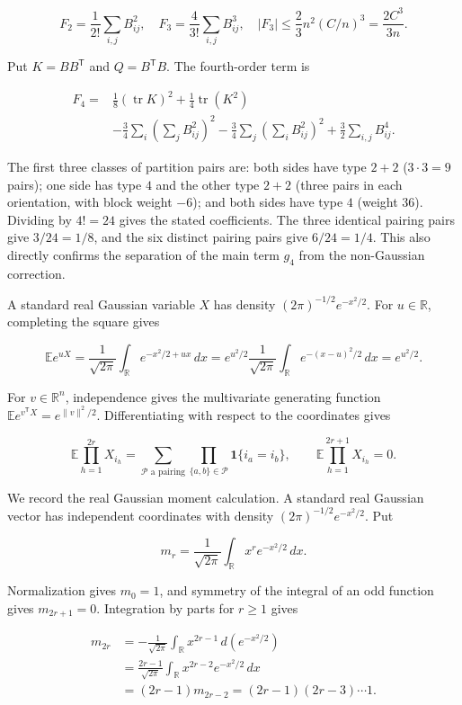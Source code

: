 \documentclass[11pt,a4paper]{article}
\begin{document}
\[
F_2=\frac1{2!}\sum_{i,j}B_{ij}^2,\quad
F_3=\frac4{3!}\sum_{i,j}B_{ij}^3,\quad
|F_3|\le\frac23n^2(C/n)^3=\frac{2C^3}{3n}.
\]

Put \(K=BB^{\mathsf T}\) and \(Q=B^{\mathsf T}B\). The fourth-order term is

\[
\begin{aligned}
F_4={}&\frac18(\operatorname{tr}K)^2+\frac14\operatorname{tr}(K^2)\\
&-\frac34\sum_i\left(\sum_jB_{ij}^2\right)^2
-\frac34\sum_j\left(\sum_iB_{ij}^2\right)^2
+\frac32\sum_{i,j}B_{ij}^4.
\end{aligned}
\]

The first three classes of partition pairs are: both sides have type \(2+2\) (\(3\cdot3=9\) pairs); one side has type \(4\) and the other type \(2+2\) (three pairs in each orientation, with block weight \(-6\)); and both sides have type \(4\) (weight \(36\)). Dividing by \(4!=24\) gives the stated coefficients. The three identical pairing pairs give \(3/24=1/8\), and the six distinct pairing pairs give \(6/24=1/4\). This also directly confirms the separation of the main term \(g_4\) from the non-Gaussian correction.

A standard real Gaussian variable \(X\) has density \((2\pi)^{-1/2}e^{-x^2/2}\). For \(u\in\mathbb R\), completing the square gives

\[
\mathbb Ee^{uX}=\frac1{\sqrt{2\pi}}\int_{\mathbb R}e^{-x^2/2+ux}\,dx
=e^{u^2/2}\frac1{\sqrt{2\pi}}\int_{\mathbb R}e^{-(x-u)^2/2}\,dx=e^{u^2/2}.
\]

For \(v\in\mathbb R^n\), independence gives the multivariate generating function \(\mathbb Ee^{v^{\mathsf T}X}=e^{\|v\|^2/2}\). Differentiating with respect to the coordinates gives

\[
\mathbb E\prod_{h=1}^{2r}X_{i_h}
=\sum_{\mathcal P\text{ a pairing}}\prod_{\{a,b\}\in\mathcal P}\mathbf1\{i_a=i_b\},
\qquad \mathbb E\prod_{h=1}^{2r+1}X_{i_h}=0.
\]

We record the real Gaussian moment calculation. A standard real Gaussian vector has independent coordinates with density \((2\pi)^{-1/2}e^{-x^2/2}\). Put

\[
m_r=\frac1{\sqrt{2\pi}}\int_{\mathbb R}x^re^{-x^2/2}\,dx.
\]

Normalization gives \(m_0=1\), and symmetry of the integral of an odd function gives \(m_{2r+1}=0\). Integration by parts for \(r\ge1\) gives

\[
\begin{aligned}
m_{2r}
&=-\frac1{\sqrt{2\pi}}\int_{\mathbb R}x^{2r-1}\,d(e^{-x^2/2})\\
&=\frac{2r-1}{\sqrt{2\pi}}\int_{\mathbb R}x^{2r-2}e^{-x^2/2}\,dx\\
&=(2r-1)m_{2r-2}
=(2r-1)(2r-3)\cdots1.
\end{aligned}
\]
\end{document}
